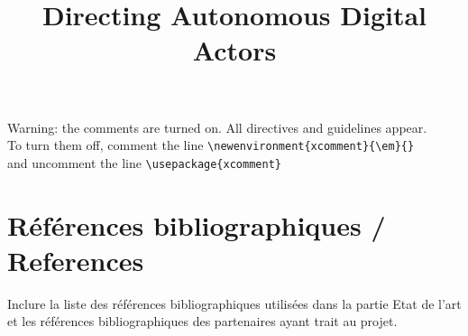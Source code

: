 \documentclass[a4paper,10pt]{article}
\title{\mytitle}
\title{Directing Autonomous Digital Actors}
\begin{document}
\maketitle

\begin{xcomment} 
Warning: the comments are turned on. All directives and guidelines appear.\\
To turn them off, comment the line   \verb|\newenvironment{xcomment}{\em}{}|\\
and uncomment the line  \verb|\usepackage{xcomment}|
\end{xcomment} 



 
\setcounter{tocdepth}{1}
\tableofcontents
\newpage
















\section{R\'ef\'erences bibliographiques / References}
\begin{xcomment}  
Inclure la liste des r\'ef\'erences bibliographiques utilis\'ees dans la partie Etat de l'art  et les r\'ef\'erences bibliographiques des partenaires ayant trait au projet.
\end{xcomment}
\small

\end{document}
